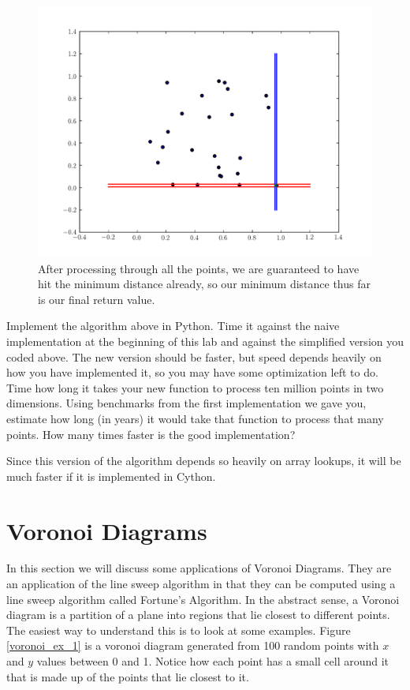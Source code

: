 \begin{figure}[H]
\includegraphics[width = .8\textwidth]{sweep22.pdf}
\caption{After processing through all the points, we are guaranteed to have hit the minimum distance already, so our minimum distance thus far is our final return value.}
\end{figure}


\begin{problem}
Implement the algorithm above in Python. 
Time it against the naive implementation at the beginning of this lab and against the simplified version you coded above.
The new version should be faster, but speed depends heavily on how you have implemented it, so you may have some optimization left to do.
Time how long it takes your new function to process ten million points in two dimensions. 
Using benchmarks from the first implementation we gave you, estimate how long (in years) it would take that function to process that many points.
How many times faster is the good implementation?
\end{problem}

Since this version of the algorithm depends so heavily on array lookups, it will be much faster if it is implemented in Cython.

\section*{Voronoi Diagrams}

In this section we will discuss some applications of Voronoi Diagrams.
They are an application of the line sweep algorithm in that they can be computed using a line sweep algorithm called Fortune's Algorithm.
In the abstract sense, a Voronoi diagram is a partition of a plane into regions that lie closest to different points.
The easiest way to understand this is to look at some examples.
Figure \ref{voronoi_ex_1} is a voronoi diagram generated from 100 random points with $x$ and $y$ values between 0 and 1.
Notice how each point has a small  cell around it that is made up of the points that lie closest to it.

